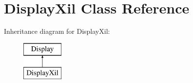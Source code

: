 \hypertarget{class_display_xil}{\section{Display\+Xil Class Reference}
\label{class_display_xil}
}
Inheritance diagram for Display\+Xil\+:\begin{figure}[H]
\begin{center}
\leavevmode
\includegraphics[height=2.000000cm]{class_display_xil}
\end{center}
\end{figure}

